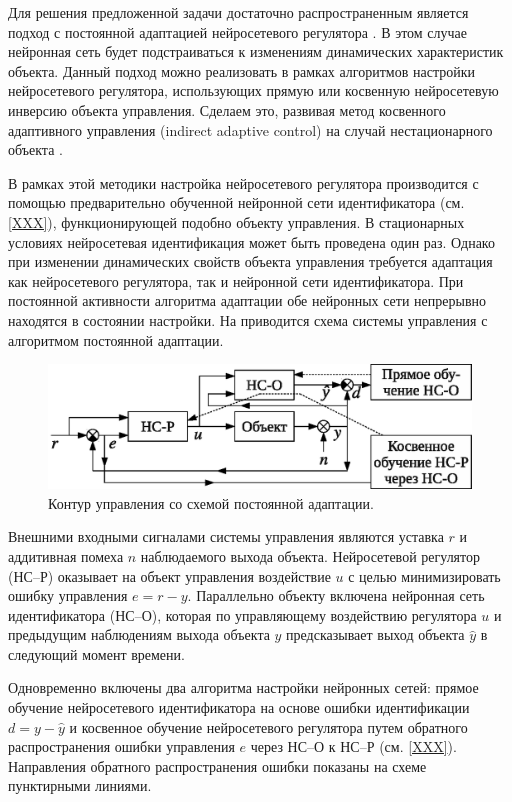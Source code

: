 Для решения предложенной задачи достаточно распространенным является
подход с постоянной адаптацией нейросетевого регулятора \cite{XXX}.  В
этом случае нейронная сеть будет подстраиваться к изменениям
динамических характеристик объекта.  Данный подход можно реализовать в
рамках алгоритмов настройки нейросетевого регулятора, использующих
прямую или косвенную нейросетевую инверсию объекта управления.
Сделаем это, развивая метод косвенного адаптивного управления
(indirect adaptive control) на случай нестационарного объекта
\cite{XXX}.

В рамках этой методики настройка нейросетевого регулятора производится
с помощью предварительно обученной нейронной сети идентификатора
(см. \ref{XXX}), функционирующей подобно объекту управления.  В
стационарных условиях нейросетевая идентификация может быть проведена
один раз.  Однако при изменении динамических свойств объекта
управления требуется адаптация как нейросетевого регулятора, так и
нейронной сети идентификатора.  При постоянной активности алгоритма
адаптации обе нейронных сети непрерывно находятся в состоянии
настройки.  На  приводится схема
системы управления с алгоритмом постоянной адаптации.

\begin{figure}[h]
\centering
\includegraphics{permanent_adoption_rus}
\caption{Контур управления со схемой постоянной адаптации.}
\label{fig:permanent_adoption_loop}
\end{figure}

Внешними входными сигналами системы управления являются уставка $r$ и
аддитивная помеха $n$ наблюдаемого выхода объекта.  Нейросетевой
регулятор (НС--Р) оказывает на объект управления воздействие $u$ с
целью минимизировать ошибку управления $e=r-y$.  Параллельно объекту
включена нейронная сеть идентификатора (НС--О), которая по управляющему
воздействию регулятора $u$ и предыдущим наблюдениям выхода объекта $y$
предсказывает выход объекта $\hat{y}$ в следующий момент времени.

Одновременно включены два алгоритма настройки нейронных сетей: прямое
обучение нейросетевого идентификатора на основе ошибки идентификации
$d=y-\hat{y}$ и косвенное обучение нейросетевого регулятора путем
обратного распространения ошибки управления $e$ через НС--О к НС--Р
(см. \ref{XXX}).  Направления обратного распространения ошибки
показаны на схеме пунктирными линиями.

